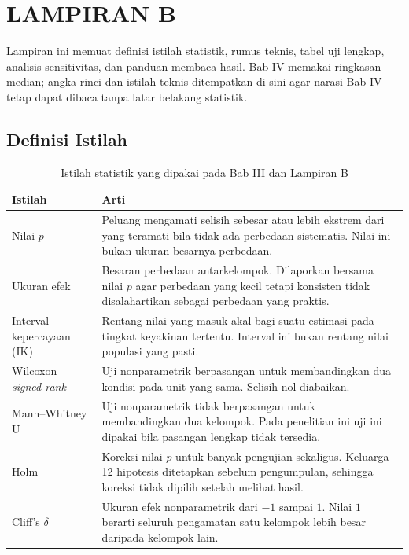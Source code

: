 \chapter*{LAMPIRAN B}

Lampiran ini memuat definisi istilah statistik, rumus teknis, tabel uji lengkap, analisis sensitivitas, dan panduan membaca hasil. Bab IV memakai ringkasan median; angka rinci dan istilah teknis ditempatkan di sini agar narasi Bab IV tetap dapat dibaca tanpa latar belakang statistik.

\section{Definisi Istilah}

\begin{table}[H]
  \centering
  \footnotesize
  \caption{Istilah statistik yang dipakai pada Bab III dan Lampiran B}
  \label{tab:lampiran-b-istilah}
  \begin{tabularx}{\textwidth}{|>{\raggedright\arraybackslash}p{3.4cm}|>{\raggedright\arraybackslash}X|}
    \hline
    Istilah & Arti \\
    \hline
    Nilai $p$ & Peluang mengamati selisih sebesar atau lebih ekstrem dari yang teramati bila tidak ada perbedaan sistematis. Nilai ini bukan ukuran besarnya perbedaan. \\
    \hline
    Ukuran efek & Besaran perbedaan antarkelompok. Dilaporkan bersama nilai $p$ agar perbedaan yang kecil tetapi konsisten tidak disalahartikan sebagai perbedaan yang praktis. \\
    \hline
    Interval kepercayaan (IK) & Rentang nilai yang masuk akal bagi suatu estimasi pada tingkat keyakinan tertentu. Interval ini bukan rentang nilai populasi yang pasti. \\
    \hline
    Wilcoxon \textit{signed-rank} & Uji nonparametrik berpasangan untuk membandingkan dua kondisi pada unit yang sama. Selisih nol diabaikan. \\
    \hline
    Mann--Whitney U & Uji nonparametrik tidak berpasangan untuk membandingkan dua kelompok. Pada penelitian ini uji ini dipakai bila pasangan lengkap tidak tersedia. \\
    \hline
    Holm & Koreksi nilai $p$ untuk banyak pengujian sekaligus. Keluarga 12 hipotesis ditetapkan sebelum pengumpulan, sehingga koreksi tidak dipilih setelah melihat hasil. \\
    \hline
    Cliff's $\delta$ & Ukuran efek nonparametrik dari $-1$ sampai $1$. Nilai $1$ berarti seluruh pengamatan satu kelompok lebih besar daripada kelompok lain. \\

\end{tabularx}
\end{table}
